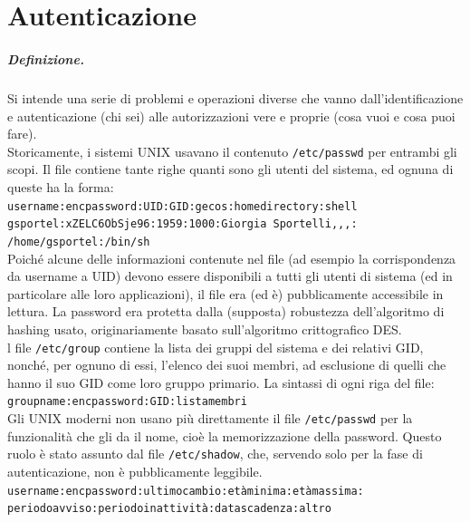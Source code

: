 \documentclass[a4paper]{report}
\newcommand\tab[1][1cm]{\hspace*{#1}}
\begin{document}
\chapter{Autenticazione}

\paragraph{Definizione.} Si intende una serie di problemi e operazioni
diverse che vanno dall'identificazione e
autenticazione (chi sei) alle autorizzazioni
vere e proprie (cosa vuoi e cosa puoi fare).\\
Storicamente, i sistemi UNIX usavano il contenuto \texttt{/etc/passwd}
per entrambi gli scopi. Il file contiene tante righe quanti sono gli
utenti del sistema, ed ognuna di queste ha la forma:\\
\tab \texttt{username:encpassword:UID:GID:gecos:homedirectory:shell}\\
\tab \texttt{gsportel:xZELC6ObSje96:1959:1000:Giorgia
Sportelli,,,:\\\tab/home/gsportel:/bin/sh}\\
Poiché alcune delle informazioni contenute nel file (ad esempio la
corrispondenza da username a UID) devono essere disponibili a tutti
gli utenti di sistema (ed in particolare alle loro applicazioni), il file
era (ed è) pubblicamente accessibile in lettura. La password era
protetta dalla (supposta) robustezza dell'algoritmo di hashing
usato, originariamente basato sull'algoritmo crittografico DES.\\
l file \texttt{/etc/group} contiene la lista dei gruppi del sistema e dei
relativi GID, nonché, per ognuno di essi, l'elenco dei suoi membri,
ad esclusione di quelli che hanno il suo GID come loro gruppo
primario. La sintassi di ogni riga del file:\\
\tab \texttt{groupname:encpassword:GID:listamembri}\\
Gli UNIX moderni non usano più direttamente il file
\texttt{/etc/passwd} per la funzionalità che gli da il nome, cioè la
memorizzazione della password. Questo ruolo è stato assunto dal
file \texttt{/etc/shadow}, che, servendo solo per la fase di
autenticazione, non è pubblicamente leggibile.\\
\tab \texttt{username:encpassword:ultimocambio:etàminima:etàmassima:\\\tab periodoavviso:periodoinattività:datascadenza:altro}\\
\end{document}
